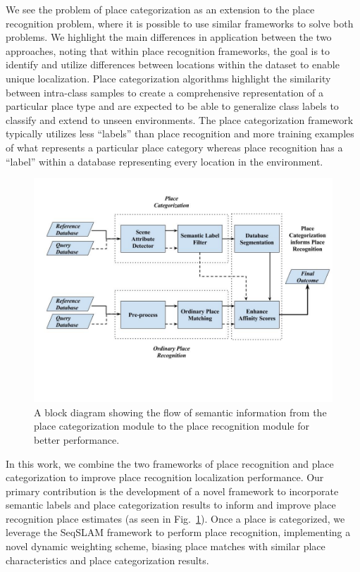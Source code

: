 \documentclass[letterpaper, 10 pt, conference]{ieeeconf}  %
\begin{document}
We see the problem of place categorization as an extension to the place recognition problem, where it is possible to use similar frameworks to solve both problems. We highlight the main differences in application between the two approaches, noting that within place recognition frameworks, the goal is to identify and utilize differences between locations within the dataset to enable unique localization. Place categorization algorithms highlight the similarity between intra-class samples to create a comprehensive representation of a particular place type and are expected to be able to generalize class labels to classify and extend to unseen environments. The place categorization framework typically utilizes less ``labels'' than place recognition and more training examples of what represents a particular place category whereas place recognition has a ``label'' within a database representing every location in the environment. 

\begin{figure}
	\includegraphics[clip, trim=1cm 5cm 0cm 2cm,scale=0.27]{flowchart}
	\caption{A block diagram showing the flow of semantic information from the place categorization module to the place recognition module for better performance.}
	\label{fig:flowchart}
\end{figure}


In this work, we combine the two frameworks of place recognition and place categorization to improve place recognition localization performance. Our primary contribution is the development of a novel framework to incorporate semantic labels and place categorization results to inform and improve place recognition place estimates (as seen in Fig.~\ref{fig:flowchart}).  
Once a place is categorized, we leverage the SeqSLAM framework to perform place recognition, implementing a novel dynamic weighting scheme, biasing place matches with similar place characteristics and place categorization results. 
\end{document}
